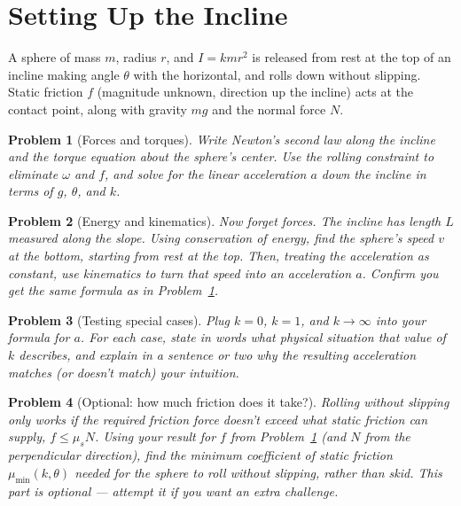 \documentclass[11pt]{article}
\newtheorem{pproblem}{Problem}
\begin{document}
\section*{Setting Up the Incline}

A sphere of mass $m$, radius $r$, and $I = kmr^2$ is released from rest at the top of an
incline making angle $\theta$ with the horizontal, and rolls down without slipping.
Static friction $f$ (magnitude unknown, direction up the incline) acts at the contact
point, along with gravity $mg$ and the normal force $N$.

\begin{pproblem}[Forces and torques] \label{prob:forces}
Write Newton's second law along the incline and the torque equation about the sphere's
center. Use the rolling constraint to eliminate $\omega$ and $f$, and solve for the
linear acceleration $a$ down the incline in terms of $g$, $\theta$, and $k$.
\end{pproblem}

\begin{pproblem}[Energy and kinematics] \label{prob:energy}
Now forget forces. The incline has length $L$ measured along the slope. Using
conservation of energy, find the sphere's speed $v$ at the bottom, starting from rest at
the top. Then, treating the acceleration as constant, use kinematics to turn that speed
into an acceleration $a$. Confirm you get the same formula as in
Problem~\ref{prob:forces}.
\end{pproblem}

\begin{pproblem}[Testing special cases] \label{prob:cases}
Plug $k = 0$, $k = 1$, and $k \to \infty$ into your formula for $a$. For each case,
state in words what physical situation that value of $k$ describes, and explain in a
sentence or two why the resulting acceleration matches (or doesn't match) your
intuition.
\end{pproblem}

\begin{pproblem}[Optional: how much friction does it take?] \label{prob:friction}
Rolling without slipping only works if the required friction force doesn't exceed what
static friction can supply, $f \le \mu_s N$. Using your result for $f$ from
Problem~\ref{prob:forces} (and $N$ from the perpendicular direction), find the
\emph{minimum} coefficient of static friction $\mu_{\min}(k,\theta)$ needed for the
sphere to roll without slipping, rather than skid. This part is optional --- attempt it
if you want an extra challenge.
\end{pproblem}
\end{document}
